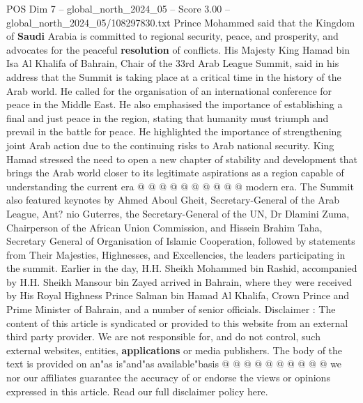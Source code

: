 \begin{textsample}{POS Dim 7 – global\_north\_2024\_05 – Score 3.00 – global\_north\_2024\_05/108297830.txt}
Prince Mohammed said that the Kingdom of \textbf{Saudi} Arabia is committed to regional security, peace, and prosperity, and advocates for the peaceful \textbf{resolution} of conflicts.
His Majesty King Hamad bin Isa Al Khalifa of Bahrain, Chair of the 33rd Arab League Summit, said in his address that the Summit is taking place at a critical time in the history of the Arab world.
He called for the organisation of an international conference for peace in the Middle East.
He also emphasised the importance of establishing a final and just peace in the region, stating that humanity must triumph and prevail in the battle for peace.
He highlighted the importance of strengthening joint Arab action due to the continuing risks to Arab national security.
King Hamad stressed the need to open a new chapter of stability and development that brings the Arab world closer to its legitimate aspirations as a region capable of understanding the current era @ @ @ @ @ @ @ @ @ @ modern era.
The Summit also featured keynotes by Ahmed Aboul Gheit, Secretary-General of the Arab League, Ant? nio Guterres, the Secretary-General of the UN, Dr Dlamini Zuma, Chairperson of the African Union Commission, and Hissein Brahim Taha, Secretary General of Organisation of Islamic Cooperation, followed by statements from Their Majesties, Highnesses, and Excellencies, the leaders participating in the summit.
Earlier in the day, H.H.
Sheikh Mohammed bin Rashid, accompanied by H.H.
Sheikh Mansour bin Zayed arrived in Bahrain, where they were received by His Royal Highness Prince Salman bin Hamad Al Khalifa, Crown Prince and Prime Minister of Bahrain, and a number of senior officials.
Disclaimer : The content of this article is syndicated or provided to this website from an external third party provider.
We are not responsible for, and do not control, such external websites, entities, \textbf{applications} or media publishers.
The body of the text is provided on an"as is"and"as available"basis @ @ @ @ @ @ @ @ @ @ we nor our affiliates guarantee the accuracy of or endorse the views or opinions expressed in this article.
Read our full disclaimer policy here.

\end{textsample}
